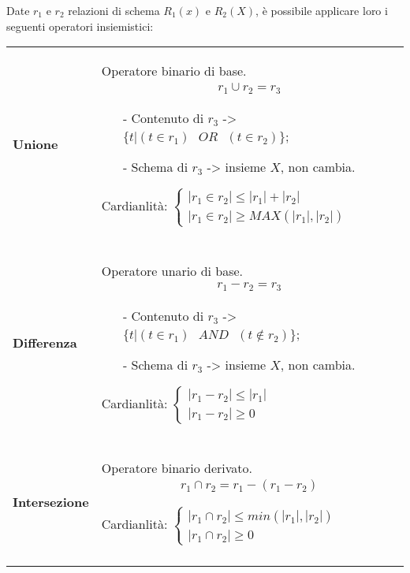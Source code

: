 \documentclass[a4paper, 10pt]{report}
\begin{document}
\noindent Date $r_1$ e $r_2$ relazioni di schema $R_1(x)$ e $R_2(X)$, è possibile applicare loro i seguenti operatori insiemistici:
\begin{longtable}{| p{} | p{} |}
\textbf{Unione} & Operatore binario di base.
\begin{align*}
r_1 \cup r_2 = r_3
\end{align*}

\begin{itemize}
\item[-] Contenuto di $r_3$ -> $\{t | (t \in r_1) \text{ } OR \text{ } (t \in r_2) \}$;
\item[-] Schema di $r_3$ -> insieme $X$, non cambia.
\end{itemize}

Cardianlità: $\begin{cases} 
|r_1 \in r_2| \le |r_1|\text{} +\text{} |r_2|\\ 
|r_1 \in r_2| \ge MAX(|r_1|, |r_2|)
\end{cases}$ 

\\\\
\textbf{Differenza} & Operatore unario di base.
\begin{align*}
r_1 \text{} - \text{} r_2 = r_3
\end{align*}

\begin{itemize}
\item[-] Contenuto di $r_3$ -> $\{t | (t \in r_1) \text{ } AND \text{ } (t \notin r_2) \}$;
\item[-] Schema di $r_3$ -> insieme $X$, non cambia.
\end{itemize}

Cardianlità: $\begin{cases} 
|r_1 \text{} - \text{} r_2| \le |r_1|\\ 
|r_1 \text{} - \text{} r_2| \ge 0
\end{cases}$ 

\\\\
\textbf{Intersezione} & Operatore binario derivato.
\begin{align*}
r_1 \cap r_2 = r_1\text{} - \text{} (r_1 \text{} - \text{} r_2) 
\end{align*}

Cardianlità: $\begin{cases} 
|r_1 \cap r_2| \le min(|r_1|, |r_2|)\\ 
|r_1 \cap r_2| \ge 0
\end{cases}$ 

\\\\
\end{longtable}
\end{document}
